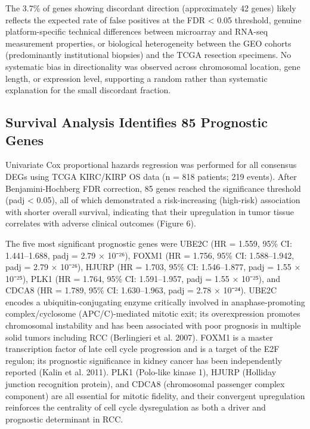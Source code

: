 \documentclass[
  12pt,
]{article}
\begin{document}
The 3.7\% of genes showing discordant direction (approximately 42 genes)
likely reflects the expected rate of false positives at the FDR
\textless{} 0.05 threshold, genuine platform-specific technical
differences between microarray and RNA-seq measurement properties, or
biological heterogeneity between the GEO cohorts (predominantly
institutional biopsies) and the TCGA resection specimens. No systematic
bias in directionality was observed across chromosomal location, gene
length, or expression level, supporting a random rather than systematic
explanation for the small discordant fraction.

\subsection{Survival Analysis Identifies 85 Prognostic
Genes}\label{survival-analysis-identifies-85-prognostic-genes}

Univariate Cox proportional hazards regression was performed for all
consensus DEGs using TCGA KIRC/KIRP OS data (n = 818 patients; 219
events). After Benjamini-Hochberg FDR correction, 85 genes reached the
significance threshold (padj \textless{} 0.05), all of which
demonstrated a risk-increasing (high-risk) association with shorter
overall survival, indicating that their upregulation in tumor tissue
correlates with adverse clinical outcomes (Figure 6).

The five most significant prognostic genes were UBE2C (HR = 1.559, 95\%
CI: 1.441--1.688, padj = 2.79 × 10⁻²⁶), FOXM1 (HR = 1.756, 95\% CI:
1.588--1.942, padj = 2.79 × 10⁻²⁶), HJURP (HR = 1.703, 95\% CI:
1.546--1.877, padj = 1.55 × 10⁻²⁵), PLK1 (HR = 1.764, 95\% CI:
1.591--1.957, padj = 1.55 × 10⁻²⁵), and CDCA8 (HR = 1.789, 95\% CI:
1.630--1.963, padj = 2.78 × 10⁻²⁴). UBE2C encodes a
ubiquitin-conjugating enzyme critically involved in anaphase-promoting
complex/cyclosome (APC/C)-mediated mitotic exit; its overexpression
promotes chromosomal instability and has been associated with poor
prognosis in multiple solid tumors including RCC (Berlingieri et al.
2007). FOXM1 is a master transcription factor of late cell cycle
progression and is a target of the E2F regulon; its prognostic
significance in kidney cancer has been independently reported (Kalin et
al. 2011). PLK1 (Polo-like kinase 1), HJURP (Holliday junction
recognition protein), and CDCA8 (chromosomal passenger complex
component) are all essential for mitotic fidelity, and their convergent
upregulation reinforces the centrality of cell cycle dysregulation as
both a driver and prognostic determinant in RCC.
\end{document}
